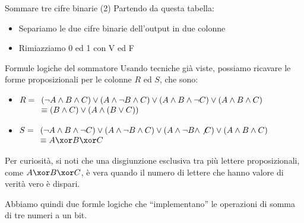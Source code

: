 \documentclass[aspectratio=169,10pt,dvipsnames,xcolor=table,handout]{beamer}
\begin{document}
\begin{frame}{Sommare tre cifre binarie (2)}
    \medskip
    Partendo da questa tabella:
    \begin{itemize}
        \item<2-> Separiamo le due cifre binarie dell'output in due colonne
        \item<4-> Rimiazziamo 0 ed 1 con V ed F
    \end{itemize}
\end{frame}

\begin{frame}{Formule logiche del sommatore}
    Usando tecniche già viste, possiamo ricavare le forme proposizionali per le colonne $R$ ed $S$, che sono:
    \begin{itemize}
        \item $R = \begin{array}[t]{l}
            (\lnot A \land B \land C) \lor (A \land \lnot B \land C) \lor (A \land B \land \lnot C) \lor (A \land B \land C) \\
            \equiv (B \wedge C) \vee (A \wedge (B \vee C))
        \end{array}$
        \item $S = \begin{array}[t]{l}
            (\lnot A \land B \land \lnot C) \lor (A \land \lnot B \land C) \lor (A \land \lnot B \land \not C) \lor (A \land B \land C) \\
            \equiv A \xor B \xor C
        \end{array}$
    \end{itemize}

    \smallskip
    Per curiosità, si noti che una disgiunzione esclusiva tra più lettere proposizionali, come $A \xor B \xor C$, è vera quando il numero di lettere che hanno valore di verità vero è dispari.

    \medskip
    Abbiamo quindi due formle logiche che ``implementano''  le operazioni di somma di tre numeri a un bit.
\end{frame}
\end{document}
